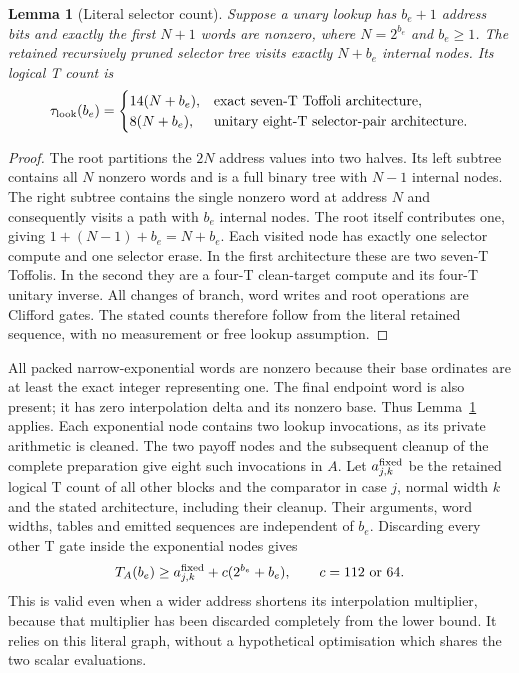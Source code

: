 \documentclass[11pt]{article}
\newtheorem{lemma}[theorem]{Lemma}
\begin{document}
\begin{lemma}[Literal selector count]
\label{lem:raw-selector-count}
Suppose a unary lookup has $b_e+1$ address bits and exactly the first
$N+1$ words are nonzero, where $N=2^{b_e}$ and $b_e\geq1$.
The retained recursively pruned selector tree visits exactly $N+b_e$
internal nodes. Its logical T count is
\begin{equation}
 \tau_{\rm look}(b_e)=
 \begin{cases}
 14(N+b_e),&\text{exact seven-T Toffoli architecture},\\
 8(N+b_e),&\text{unitary eight-T selector-pair architecture}.
 \end{cases}
\end{equation}
\end{lemma}
\begin{proof}
The root partitions the $2N$ address values into two halves. Its left
subtree contains all $N$ nonzero words and is a full binary tree with
$N-1$ internal nodes. The right subtree contains the single nonzero word
at address $N$ and consequently visits a path with $b_e$ internal nodes.
The root itself contributes one, giving $1+(N-1)+b_e=N+b_e$.
Each visited node has exactly one selector compute and one selector
erase. In the first architecture these are two seven-T Toffolis. In the
second they are a four-T clean-target compute and its four-T unitary
inverse. All changes of branch, word writes and root operations are
Clifford gates. The stated counts therefore follow from the literal
retained sequence, with no measurement or free lookup assumption.
\end{proof}

All packed narrow-exponential words are nonzero because their base
ordinates are at least the exact integer representing one. The final
endpoint word is also present; it has zero interpolation delta and its
nonzero base. Thus Lemma~\ref{lem:raw-selector-count} applies.
Each exponential node contains two lookup invocations, as its private
arithmetic is cleaned. The two payoff nodes and the subsequent cleanup
of the complete preparation give eight such invocations in $A$.
Let $a^{\rm fixed}_{j,k}$ be the retained logical T count of all other
blocks and the comparator in case $j$, normal width $k$ and the stated
architecture, including their cleanup. Their arguments, word widths,
tables and emitted sequences are independent of $b_e$. Discarding every
other T gate inside the exponential nodes gives
\begin{equation}
 T_A(b_e)\geq a^{\rm fixed}_{j,k}+c(2^{b_e}+b_e),
 \qquad c=112\text{ or }64.
\end{equation}
This is valid even when a wider address shortens its interpolation
multiplier, because that multiplier has been discarded completely from
the lower bound. It relies on this literal graph, without a hypothetical
optimisation which shares the two scalar evaluations.
\end{document}
